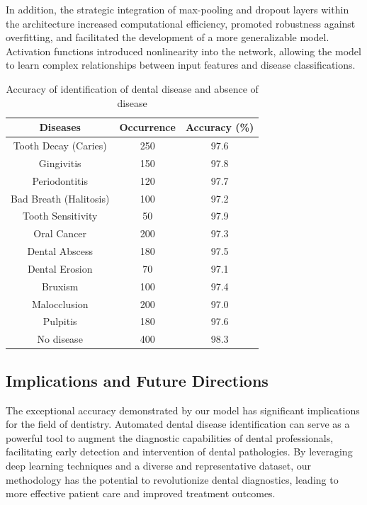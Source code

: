 \documentclass[journal,twoside,web]{ieeecolor}
\begin{document}
In addition, the strategic integration of max-pooling and dropout layers within the architecture increased computational efficiency, promoted robustness against overfitting, and facilitated the development of a more generalizable model. Activation functions introduced nonlinearity into the network, allowing the model to learn complex relationships between input features and disease classifications.

\begin{table}[h]
    \centering
    \begin{tabular}{|c|c|c|}
    \hline
    \textbf{Diseases} & \textbf{Occurrence} & \textbf{Accuracy (\%)} \\
    \hline
    Tooth Decay (Caries) & 250 & 97.6 \\
    Gingivitis & 150 & 97.8 \\
    Periodontitis & 120 & 97.7 \\
    Bad Breath (Halitosis) & 100 & 97.2 \\
    Tooth Sensitivity & 50 & 97.9 \\
    Oral Cancer & 200 & 97.3 \\
    Dental Abscess & 180 & 97.5 \\
    Dental Erosion & 70 & 97.1 \\
    Bruxism & 100 & 97.4 \\
    Malocclusion & 200 & 97.0 \\
    Pulpitis & 180 & 97.6 \\
    No disease & 400 & 98.3 \\
    \hline
    \end{tabular}
    \caption{Accuracy of identification of dental disease and absence of disease}
    \label{tab:dental_diseases}
\end{table}

\subsection{Implications and Future Directions}

The exceptional accuracy demonstrated by our model has significant implications for the field of dentistry. Automated dental disease identification can serve as a powerful tool to augment the diagnostic capabilities of dental professionals, facilitating early detection and intervention of dental pathologies. By leveraging deep learning techniques and a diverse and representative dataset, our methodology has the potential to revolutionize dental diagnostics, leading to more effective patient care and improved treatment outcomes.
\end{document}
